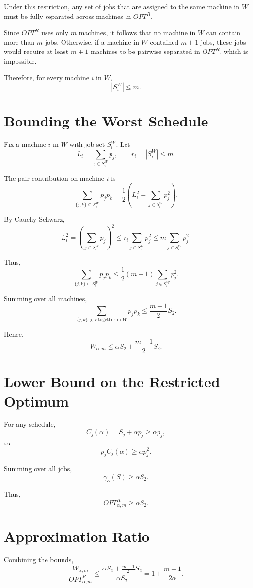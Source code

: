 \documentclass[11pt]{article}
\begin{document}
Under this restriction, any set of jobs that are assigned to the same machine in $W$ must be fully separated across machines in $OPT^R$.

Since $OPT^R$ uses only $m$ machines, it follows that no machine in $W$ can contain more than $m$ jobs. Otherwise, if a machine in $W$ contained $m+1$ jobs, these jobs would require at least $m+1$ machines to be pairwise separated in $OPT^R$, which is impossible.

Therefore, for every machine $i$ in $W$,
\[
|S_i^W| \le m.
\]

\section{Bounding the Worst Schedule}

Fix a machine $i$ in $W$ with job set $S_i^W$. Let
\[
L_i = \sum_{j \in S_i^W} p_j, \qquad r_i = |S_i^W| \le m.
\]

The pair contribution on machine $i$ is
\[
\sum_{\{j,k\} \subseteq S_i^W} p_j p_k
=
\frac{1}{2} \left( L_i^2 - \sum_{j \in S_i^W} p_j^2 \right).
\]

By Cauchy-Schwarz,
\[
L_i^2
=
\left( \sum_{j \in S_i^W} p_j \right)^2
\le
r_i \sum_{j \in S_i^W} p_j^2
\le
m \sum_{j \in S_i^W} p_j^2.
\]

Thus,
\[
\sum_{\{j,k\} \subseteq S_i^W} p_j p_k
\le
\frac{1}{2}(m-1)\sum_{j \in S_i^W} p_j^2.
\]

Summing over all machines,
\[
\sum_{\{j,k\}: j,k \text{ together in } W} p_j p_k
\le
\frac{m-1}{2} S_2.
\]

Hence,
\[
W_{\alpha,m}
\le
\alpha S_2 + \frac{m-1}{2} S_2.
\]

\section{Lower Bound on the Restricted Optimum}

For any schedule,
\[
C_j(\alpha) = S_j + \alpha p_j \ge \alpha p_j,
\]
so
\[
p_j C_j(\alpha) \ge \alpha p_j^2.
\]

Summing over all jobs,
\[
\gamma_{\alpha}(S) \ge \alpha S_2.
\]

Thus,
\[
OPT_{\alpha,m}^R \ge \alpha S_2.
\]

\section{Approximation Ratio}

Combining the bounds,
\[
\frac{W_{\alpha,m}}{OPT_{\alpha,m}^R}
\le
\frac{\alpha S_2 + \frac{m-1}{2} S_2}{\alpha S_2}
=
1 + \frac{m-1}{2\alpha}.
\]
\end{document}
